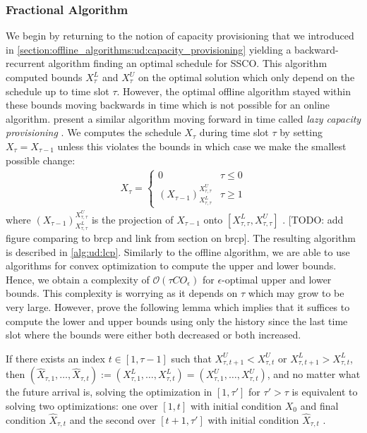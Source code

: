 \subsubsection{Fractional Algorithm}

We begin by returning to the notion of capacity provisioning that we introduced in \autoref{section:offline_algorithms:ud:capacity_provisioning} yielding a backward-recurrent algorithm finding an optimal schedule for SSCO. This algorithm computed bounds $X_{\tau}^L$ and $X_{\tau}^U$ on the optimal solution which only depend on the schedule up to time slot $\tau$. However, the optimal offline algorithm stayed within these bounds moving backwards in time which is not possible for an online algorithm. \citeauthor*{Lin2011} present a similar algorithm moving forward in time called \emph{lazy capacity provisioning} \cite{Lin2011}. We computes the schedule $X_{\tau}$ during time slot $\tau$ by setting $X_{\tau} = X_{\tau-1}$ unless this violates the bounds in which case we make the smallest possible change: \begin{align*}
    X_{\tau} = \begin{cases}
        0 & \tau \leq 0 \\
        (X_{\tau-1})_{X_{\tau,\tau}^L}^{X_{\tau,\tau}^U} & \tau \geq 1
    \end{cases}
\end{align*} where $(X_{\tau-1})_{X_{\tau,\tau}^L}^{X_{\tau,\tau}^U}$ is the projection of $X_{\tau-1}$ onto $[X_{\tau,\tau}^L, X_{\tau,\tau}^U]$ \cite{Lin2011}. [TODO: add figure comparing to brcp and link from section on brcp]. The resulting algorithm is described in \autoref{alg:ud:lcp}. Similarly to the offline algorithm, we are able to use algorithms for convex optimization to compute the upper and lower bounds. Hence, we obtain a complexity of $\mathcal{O}(\tau C O_{\epsilon})$ for $\epsilon$-optimal upper and lower bounds. This complexity is worrying as it depends on $\tau$ which may grow to be very large. However, \citeauthor*{Lin2011} prove the following lemma which implies that it suffices to compute the lower and upper bounds using only the history since the last time slot where the bounds were either both decreased or both increased.

\begin{lemma}
If there exists an index $t \in [1, \tau-1]$ such that $X_{\tau,t+1}^U < X_{\tau,t}^U$ or $X_{\tau,t+1}^L > X_{\tau,t}^L$, then $(\hat{X}_{\tau,1},\dots,\hat{X}_{\tau,t}) := (X_{\tau,1}^L,\dots,X_{\tau,t}^L) = (X_{\tau,1}^U,\dots,X_{\tau,t}^U)$, and no matter what the future arrival is, solving the optimization in $[1,\tau']$ for $\tau' > \tau$ is equivalent to solving two optimizations: one over $[1,t]$ with initial condition $X_0$ and final condition $\hat{X}_{\tau,t}$ and the second over $[t+1,\tau']$ with initial condition $\hat{X}_{\tau,t}$ \cite{Lin2011}.
\end{lemma}

